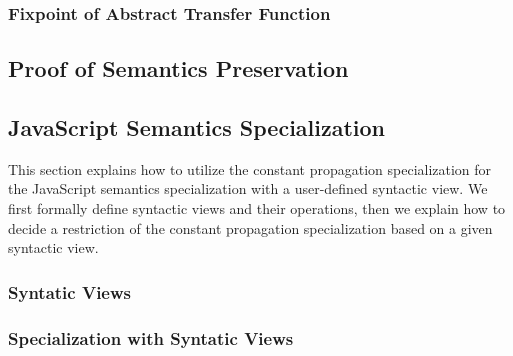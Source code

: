 \subsubsection{Fixpoint of Abstract Transfer Function}

\todo


\subsection{Proof of Semantics Preservation}

\todo





\subsection{JavaScript Semantics Specialization}

This section explains how to utilize the constant propagation specialization for
the JavaScript semantics specialization with a user-defined syntactic view.  We
first formally define syntactic views and their operations, then we explain how
to decide a restriction of the constant propagation specialization based on a
given syntactic view.

\subsubsection{Syntatic Views}

\todo

\subsubsection{Specialization with Syntatic Views}

\todo
